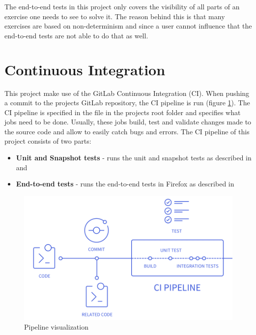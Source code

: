 The end-to-end tests in this project only covers the visibility of all parts of an exercise one needs to see to solve it. The reason behind this is that many exercises are based on non-determinism and since a user cannot influence that the end-to-end tests are not able to do that as well.

\section{Continuous Integration}
\label{section:CI}

This project make use of the GitLab Continuous Integration (CI). When pushing a commit to the projects GitLab repository, the CI pipeline is run (figure \ref{fig:pipeline}). The CI pipeline is specified in the  file in the projects root folder and specifies what jobs need to be done. Usually, these jobs build, test and validate changes made to the source code and allow to easily catch bugs and errors.
The CI pipeline of this project consists of two parts:

\begin{itemize}
    \item \textbf{Unit and Snapshot tests} - runs the unit and snapshot tests as described in  and 
    \item \textbf{End-to-end tests} - runs the end-to-end tests in Firefox as described in 
\end{itemize}

\begin{figure} 
    \centering
    \includegraphics[width=0.6 \columnwidth]{figures/pipeline.png}
    \caption{Pipeline visualization \cite{CIPipeline}} 
    \label{fig:pipeline} 
\end{figure}